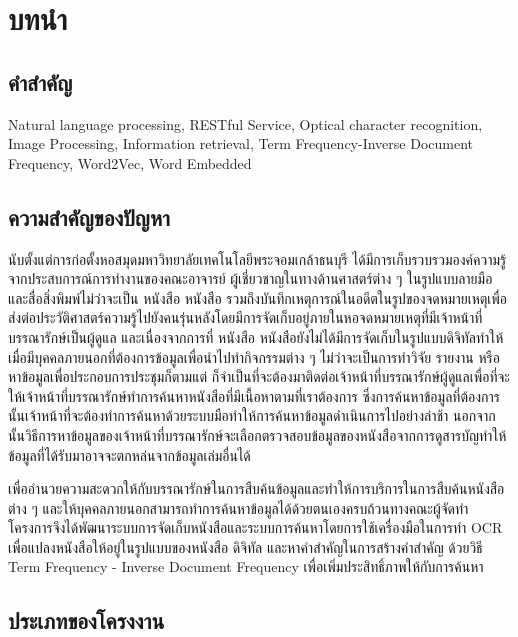 \chapter{บทนำ}

\section{คำสำคัญ}

Natural language processing, RESTful Service, Optical character recognition, Image Processing, Information retrieval, Term Frequency-Inverse Document Frequency, Word2Vec, Word Embedded 

\section{ความสำคัญของปัญหา}

นับตั้งแต่การก่อตั้งหอสมุดมหาวิทยาลัยเทคโนโลยีพระจอมเกล้าธนบุรี ได้มีการเก็บรวบรวมองค์ความรู้จากประสบการณ์การทำงานของคณะอาจารย์ ผู้เชี่ยวชาญในทางด้านศาสตร์ต่าง ๆ ในรูปแบบลายมือและสื่อสิ่งพิมพ์ไม่ว่าจะเป็น หนังสือ หนังสือ รวมถึงบันทึกเหตุการณ์ในอดีตในรูปของจดหมายเหตุเพื่อส่งต่อประวัติศาสตร์ความรู้ไปยังคนรุ่นหลังโดยมีการจัดเก็บอยู่ภายในหอจดหมายเหตุที่มีเจ้าหน้าที่บรรณารักษ์เป็นผู้ดูแล และเนื่องจากการที่ หนังสือ หนังสือยังไม่ได้มีการจัดเก็บในรูปแบบดิจิทัลทำให้เมื่อมีบุคคลภายนอกที่ต้องการข้อมูลเพื่อนำไปทำกิจกรรมต่าง ๆ ไม่ว่าจะเป็นการทำวิจัย รายงาน หรือหาข้อมูลเพื่อประกอบการประชุมก็ตามแต่ ก็จำเป็นที่จะต้องมาติดต่อเจ้าหน้าที่บรรณารักษ์ผู้ดูแลเพื่อที่จะให้เจ้าหน้าที่บรรณารักษ์ทำการค้นหาหนังสือที่มีเนื้อหาตามที่เราต้องการ ซึ่งการค้นหาข้อมูลที่ต้องการนั้นเจ้าหน้าที่จะต้องทำการค้นหาด้วยระบบมือทำให้การค้นหาข้อมูลดำเนินการไปอย่างล่าช้า นอกจากนั้นวิธีการหาข้อมูลของเจ้าหน้าที่บรรณารักษ์จะเลือกตรวจสอบข้อมูลของหนังสือจากการดูสารบัญทำให้ข้อมูลที่ได้รับมาอาจจะตกหล่นจากข้อมูลเล่มอื่นได้ 

เพื่ออำนวยความสะดวกให้กับบรรณารักษ์ในการสืบค้นข้อมูลและทำให้การบริการในการสืบค้นหนังสือต่าง ๆ และให้บุคคลภายนอกสามารถทำการค้นหาข้อมูลได้ด้วยตนเองครบถ้วนทางคณะผู้จัดทำโครงการจึงได้พัฒนาระบบการจัดเก็บหนังสือและระบบการค้นหาโดยการใช้เครื่องมือในการทำ OCR เพื่อแปลงหนังสือให้อยู่ในรูปแบบของหนังสือ ดิจิทัล และหาคำสำคัญในการสร้างคำสำคัญ ด้วยวิธี Term Frequency - Inverse Document Frequency เพื่อเพิ่มประสิทธิ์ภาพให้กับการค้นหา 

\section{ประเภทของโครงงาน}

